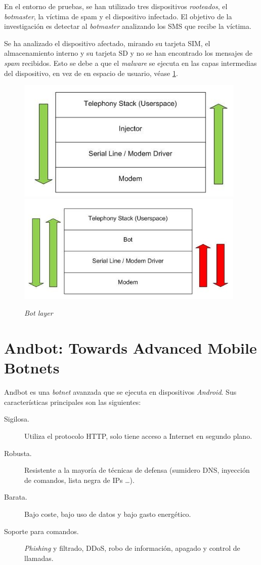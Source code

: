 \documentclass[a4paper,11pt]{report}
\begin{document}
En el entorno de pruebas, se han utilizado tres dispositivos \emph{rooteados}, el \emph{botmaster}, la víctima de spam y el dispositivo infectado. El objetivo de la investigación es detectar al \emph{botmaster} analizando los SMS que recibe la víctima.

Se ha analizado el dispositivo afectado, mirando su tarjeta SIM, el almacenamiento interno y su tarjeta SD y no se han encontrado los mensajes de \emph{spam} recibidos. Esto se debe a que el \emph{malware} se ejecuta en las capas intermedias del dispositivo, en vez de en espacio de usuario, véase \ref{botLayer}.

\begin{figure}[htb]
\begin{center}
\includegraphics[scale=0.8]{previo1}
\includegraphics[scale=0.9]{previo2}
\caption{\emph{Bot layer}}
\label{botLayer}
\end{center}
\end{figure}

\section{Andbot: Towards Advanced Mobile Botnets}

Andbot es una \emph{botnet} avanzada que se ejecuta en dispositivos \emph{Android}. Sus características principales son las siguientes:

\begin{description}
\item[Sigilosa.] Utiliza el protocolo HTTP, solo tiene acceso a Internet en segundo plano.
\item[Robusta.] Resistente a la mayoría de técnicas de defensa (sumidero DNS, inyección de comandos, lista negra de IPs \ldots).
\item[Barata.] Bajo coste, bajo uso de datos y bajo gasto energético.
\item[Soporte para comandos.] \emph{Phishing} y filtrado, DDoS, robo de información, apagado y control de llamadas.
\end{description}
\end{document}
